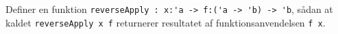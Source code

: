 \label{item:reverseApply} Definer en funktion \lstinline{reverseApply : x:'a -> f:('a -> 'b) -> 'b}, sådan at kaldet \lstinline{reverseApply x f} returnerer resultatet af funktionsanvendelsen \lstinline{f x}.
